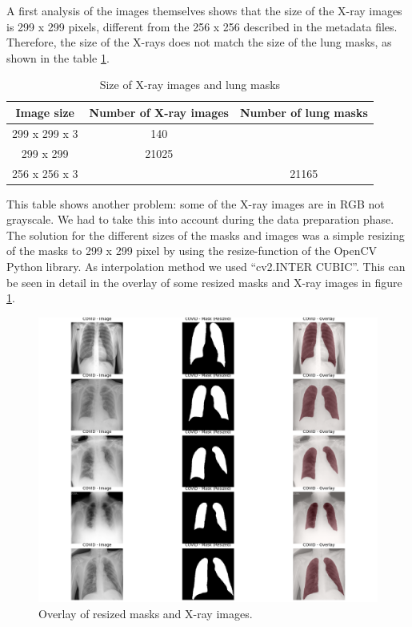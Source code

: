 \documentclass{article}
\begin{document}
A first analysis of the images themselves shows that the size of the X-ray images is 299 x 299 pixels, different from the 256 x 256 described in the metadata files. Therefore, the size of the X-rays does not match the size of the lung masks, as shown in the table \ref{tab:iamges_sizes}.
\begin{table}[htb]
    \centering
    \begin{tabular}{|c|c|c|}
        \hline
        \textbf{Image size} & \textbf{Number of X-ray images} & \textbf{Number of lung masks} \\ \hline
        299 x 299 x 3 & 140 &  \\ \hline
        299 x 299 & 21025 &  \\ \hline \hline
        256 x 256 x 3 &  & 21165 \\ \hline
    \end{tabular}
    \caption{Size of X-ray images and lung masks}
    \label{tab:iamges_sizes}
\end{table}
This table shows another problem: some of the X-ray images are in RGB not grayscale. We had to take this into account during the data preparation phase.\\
The solution for the different sizes of the masks and images was a simple resizing of the masks to 299 x 299 pixel by using the resize-function of the OpenCV Python library. As interpolation method we used “cv2.INTER CUBIC”. This can be seen in detail in the overlay of some resized masks and X-ray images in figure \ref{fig:overlay_masks_images}.

\begin{figure}[htb]
    \centering
    \includegraphics[width=1\linewidth]{overlay_masks_images.png}
    \caption{Overlay of resized masks and X-ray images.}
    \label{fig:overlay_masks_images}
\end{figure}   
\end{document}
